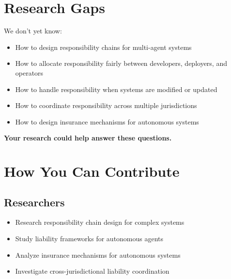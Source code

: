\section{Research Gaps}

We don't yet know:

\begin{itemize}
    \item How to design responsibility chains for multi-agent systems
    
    \item How to allocate responsibility fairly between developers, deployers, and operators
    
    \item How to handle responsibility when systems are modified or updated
    
    \item How to coordinate responsibility across multiple jurisdictions
    
    \item How to design insurance mechanisms for autonomous systems
\end{itemize}

\textbf{Your research could help answer these questions.}

\vspace{0.5cm}

\section{How You Can Contribute}

\subsection{Researchers}

\begin{itemize}
    \item Research responsibility chain design for complex systems
    \item Study liability frameworks for autonomous agents
    \item Analyze insurance mechanisms for autonomous systems
    \item Investigate cross-jurisdictional liability coordination
\end{itemize}

